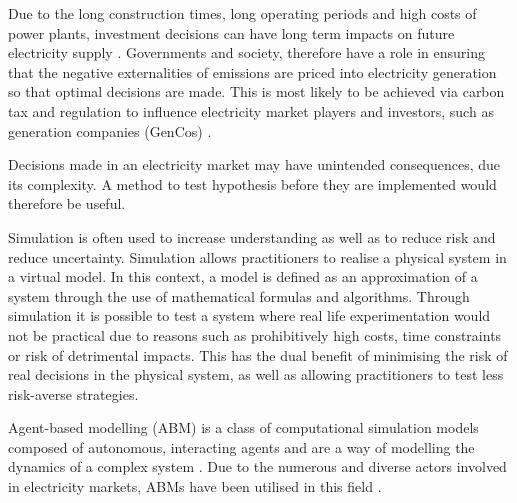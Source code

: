 
 Due to the long construction times, long operating periods and high costs of power plants, investment decisions can have long term impacts on future electricity supply \cite{Chappin2017}. Governments and society, therefore have a role in ensuring that the negative externalities of emissions are priced into electricity generation so that optimal decisions are made. This is most likely to be achieved via carbon tax and regulation to influence electricity market players and investors, such as generation companies (GenCos) \cite{May2002}.


Decisions made in an electricity market may have unintended consequences, due its complexity. A method to test hypothesis before they are implemented would therefore be useful.

Simulation is often used to increase understanding as well as to reduce risk and reduce uncertainty. Simulation allows practitioners to realise a physical system in a virtual model. In this context, a model is defined as an approximation of a system through the use of mathematical formulas and algorithms. Through simulation it is possible to test a system where real life experimentation would not be practical due to reasons such as prohibitively high costs, time constraints or risk of detrimental impacts. This has the dual benefit of minimising the risk of real decisions in the physical system, as well as allowing practitioners to test less risk-averse strategies.

Agent-based modelling (ABM) is a class of computational simulation models composed of autonomous, interacting agents and are a way of modelling the dynamics of a complex system \cite{MacAl2010}. Due to the numerous and diverse actors involved in electricity markets, ABMs have been utilised in this field \cite{Ringler2016a}.

